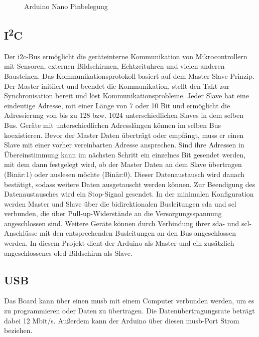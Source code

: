 	\begin{figure}
%		
		\caption{Arduino Nano Pinbelegung \cite{Ard.2024}}
		\label{arduinopinout}
	\end{figure}

\subsection{I\textsuperscript{2}C}

Der \ac{i2c}-Bus ermöglicht die geräteinterne Kommunikation von Mikrocontrollern mit Sensoren, externen Bildschirmen, Echtzeituhren und vielen anderen Bausteinen. Das Kommunikationsprotokoll basiert auf dem Master-Slave-Prinzip. Der Master initiiert und beendet die Kommunikation, stellt den Takt zur Synchronisation bereit und löst Kommunikationsprobleme. Jeder Slave hat eine eindeutige Adresse, mit einer Länge von 7 oder 10 Bit und ermöglicht die Adressierung von bis zu 128 bzw. 1024 unterschiedlichen Slaves in dem selben Bus. Geräte mit unterschiedlichen Adresslängen können im selben Bus koexistieren. Bevor der Master Daten überträgt oder empfängt, muss er einen Slave mit einer vorher vereinbarten Adresse ansprechen.\cite{Meroth.2021}\cite{STM1.2015}\cite{Bernstein.2020} Sind ihre Adressen in Übereinstimmung kann im nächsten Schritt ein einzelnes Bit gesendet werden, mit dem dann festgelegt wird, ob der Master Daten an dem Slave übertragen (Binär:1) oder auslesen möchte (Binär:0). Dieser Datenaustausch wird danach bestätigt, sodass weitere Daten ausgetauscht werden können. Zur Beendigung des Datenaustausches wird ein Stop-Signal gesendet.\cite{Gehrke.2022} In der minimalen Konfiguration werden Master und Slave über die bidirektionalen Busleitungen \ac{sda} und \ac{scl} verbunden, die über Pull-up-Widerstände an die Versorgungsspannung angeschlossen sind. Weitere Geräte können durch Verbindung ihrer \ac{sda}- und \ac{scl}-Anschlüsse mit den entsprechenden Busleitungen an den Bus angeschlossen werden.\cite{Meroth.2021} In diesem Projekt dient der Arduino als Master und ein zusätzlich angeschlossenes \ac{oled}-Bildschirm als Slave.

\subsection{USB}

Das Board kann über einen \ac{musb} mit einem Computer verbunden werden, um es zu programmieren oder Daten zu übertragen. Die Datenübertragungsrate beträgt dabei 12 Mbit/s. Außerdem kann der Arduino über diesen \ac{musb}-Port Strom beziehen.

